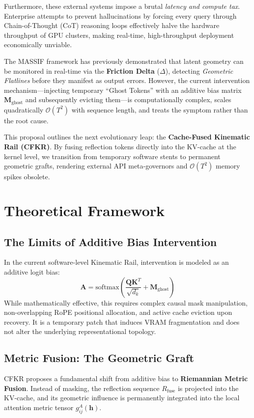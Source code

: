 \documentclass[11pt]{article}
\begin{document}
Furthermore, these external systems impose a brutal \textit{latency and compute tax}. Enterprise attempts to prevent hallucinations by forcing every query through Chain-of-Thought (CoT) reasoning loops effectively halve the hardware throughput of GPU clusters, making real-time, high-throughput deployment economically unviable. 

The MASSIF framework has previously demonstrated that latent geometry can be monitored in real-time via the \textbf{Friction Delta} ($\Delta$), detecting \textit{Geometric Flatlines} before they manifest as output errors. However, the current intervention mechanism—injecting temporary ``Ghost Tokens'' with an additive bias matrix $\mathbf{M}_{\text{ghost}}$ and subsequently evicting them—is computationally complex, scales quadratically $\mathcal{O}(T^2)$ with sequence length, and treats the symptom rather than the root cause.

This proposal outlines the next evolutionary leap: the \textbf{Cache-Fused Kinematic Rail (CFKR)}. By fusing reflection tokens directly into the KV-cache at the kernel level, we transition from temporary software stents to permanent geometric grafts, rendering external API meta-governors and $\mathcal{O}(T^2)$ memory spikes obsolete.

\section{Theoretical Framework}
\subsection{The Limits of Additive Bias Intervention}
In the current software-level Kinematic Rail, intervention is modeled as an additive logit bias:
\begin{equation}
\mathbf{A} = \text{softmax}\left( \frac{\mathbf{Q} \mathbf{K}^T}{\sqrt{d_k}} + \mathbf{M}_{\text{ghost}} \right)
\end{equation}
While mathematically effective, this requires complex causal mask manipulation, non-overlapping RoPE positional allocation, and active cache eviction upon recovery. It is a temporary patch that induces VRAM fragmentation and does not alter the underlying representational topology.

\subsection{Metric Fusion: The Geometric Graft}
CFKR proposes a fundamental shift from additive bias to \textbf{Riemannian Metric Fusion}. Instead of masking, the reflection sequence $R_{\text{fuse}}$ is projected into the KV-cache, and its geometric influence is permanently integrated into the local attention metric tensor $g_{ij}^A(\mathbf{h})$. 
\end{document}
